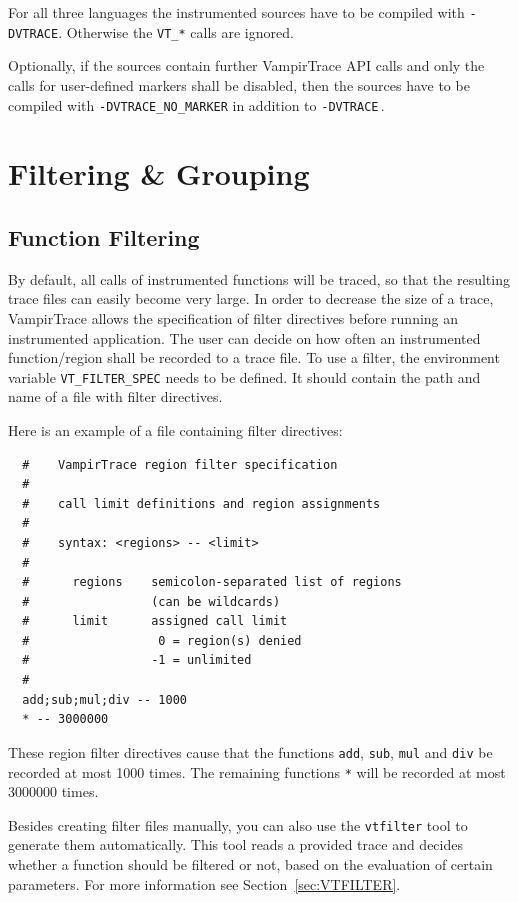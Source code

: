 \documentclass[a4paper,twoside,12pt,BCOR12mm]{scrbook}
\begin{document}
  \noindent For all three languages the instrumented sources have to be compiled 
  with \texttt{-DVTRACE}. Otherwise the \texttt{VT\_*} calls are ignored.

  Optionally, if the sources contain further VampirTrace API calls and only the
  calls for user-defined markers shall be disabled, then the sources have to be
  compiled with \texttt{-DVTRACE\_NO\_MARKER} in addition to \texttt{-DVTRACE}\,.

\chapter{Filtering \& Grouping}
\label{filtering_and_grouping}


\section{Function Filtering}
\label{sec:function_filter}

  By default, all calls of instrumented functions will be traced, so that the
  resulting trace files can easily become very large. In order to decrease the
  size of a trace, VampirTrace allows the specification of filter directives
  before running an instrumented application.
  The user can decide on how often an instrumented function/region shall be
  recorded to a trace file.
  To use a filter, the environment variable \texttt{VT\_FILTER\_SPEC} needs to be 
  defined. It should contain the path and name of a file with filter directives.
  
  Here is an example of a file containing filter directives:

\begin{verbatim}
  #    VampirTrace region filter specification
  #   
  #    call limit definitions and region assignments
  #   
  #    syntax: <regions> -- <limit>
  #   
  #      regions    semicolon-separated list of regions
  #                 (can be wildcards)
  #      limit      assigned call limit
  #                  0 = region(s) denied
  #                 -1 = unlimited
  #   
  add;sub;mul;div -- 1000
  * -- 3000000
\end{verbatim} 
   
These region filter directives cause that the functions \texttt{add}, 
\texttt{sub}, \texttt{mul} and \texttt{div} be recorded at most 1000 times. 
The remaining functions \texttt{*} will be recorded at most 3000000 times.

Besides creating filter files manually, you can also use the \texttt{vtfilter}
tool to generate them automatically. This tool reads a provided trace
and decides whether a function should be filtered or not, based on the evaluation of
certain parameters. For more information see Section~\ref{sec:VTFILTER}.
\end{document}
